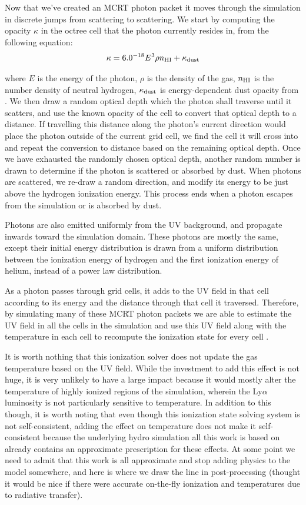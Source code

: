 Now that we've created an MCRT photon packet it moves through the simulation in discrete jumps from scattering to scattering.
We start by computing the opacity $\kappa$ in the octree cell that the photon currently resides in, from the following equation:
\begin{equation}
    \label{eq:lycrt_opacity}
    \kappa = 6.0^{-18} E^{3} \rho n_{\rm{HI}} + \kappa_{\rm{dust}}
\end{equation}

where $E$ is the energy of the photon, $\rho$ is the density of the gas, $n_{\rm{HI}}$ is the number density of neutral hydrogen, $\kappa_{\rm{dust}}$ is energy-dependent dust opacity from \citet{Weingartner2001}.
We then draw a random optical depth which the photon shall traverse until it scatters, and use the known opacity of the cell to convert that optical depth to a distance.
If travelling this distance along the photon's current direction would place the photon outside of the current grid cell, we find the cell it will cross into and repeat the conversion to distance based on the remaining optical depth.
Once we have exhausted the randomly chosen optical depth, another random number is drawn to determine if the photon is scattered or absorbed by dust.
When photons are scattered, we re-draw a random direction, and modify its energy to be just above the hydrogen ionization energy.
This process ends when a photon escapes from the simulation or is absorbed by dust.

Photons are also emitted uniformly from the UV background, and propagate inwards toward the simulation domain.
These photons are mostly the same, except their initial energy distribution is drawn from a uniform distribution between the ionization energy of hydrogen and the first ionization energy of helium, instead of a power law distribution.

As a photon passes through grid cells, it adds to the UV field in that cell according to its energy and the distance through that cell it traversed.
Therefore, by simulating many of these MCRT photon packets we are able to estimate the UV field in all the cells in the simulation and use this UV field along with the temperature in each cell to recompute the ionization state for every cell \citep{Kasen2006}.

It is worth nothing that this ionization solver does not update the gas temperature based on the UV field.
While the investment to add this effect is not huge, it is very unlikely to have a large impact because it would mostly alter the temperature of highly ionized regions of the simulation, wherein the Ly$\alpha$ luminosity is not particularly sensitive to temperature.
In addition to this though, it is worth noting that even though this ionization state solving system is not self-consistent, adding the effect on temperature does not make it self-consistent because the underlying hydro simulation all this work is based on already contains an approximate prescription for these effects.
At some point we need to admit that this work is all approximate and stop adding physics to the model somewhere, and here is where we draw the line in post-processing (thought it would be nice if there were accurate on-the-fly ionization and temperatures due to radiative transfer).


